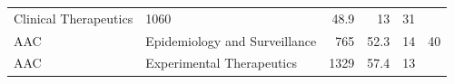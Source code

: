 \documentclass[11pt,]{article}
\begin{document}
\begin{longtable}[]{@{}llrrrr@{}}
\begin{minipage}[t]{0.43\columnwidth}
Clinical Therapeutics\strut
\end{minipage} & \begin{minipage}[t]{0.04\columnwidth}\raggedleft\strut
1060\strut
\end{minipage} & \begin{minipage}[t]{0.08\columnwidth}\raggedleft\strut
48.9\strut
\end{minipage} & \begin{minipage}[t]{0.11\columnwidth}\raggedleft\strut
13\strut
\end{minipage} & \begin{minipage}[t]{0.11\columnwidth}\raggedleft\strut
31\strut
\end{minipage}\tabularnewline
\begin{minipage}[t]{0.06\columnwidth}\raggedright\strut
AAC\strut
\end{minipage} & \begin{minipage}[t]{0.43\columnwidth}\raggedright\strut
Epidemiology and Surveillance\strut
\end{minipage} & \begin{minipage}[t]{0.04\columnwidth}\raggedleft\strut
765\strut
\end{minipage} & \begin{minipage}[t]{0.08\columnwidth}\raggedleft\strut
52.3\strut
\end{minipage} & \begin{minipage}[t]{0.11\columnwidth}\raggedleft\strut
14\strut
\end{minipage} & \begin{minipage}[t]{0.11\columnwidth}\raggedleft\strut
40\strut
\end{minipage}\tabularnewline
\begin{minipage}[t]{0.06\columnwidth}\raggedright\strut
AAC\strut
\end{minipage} & \begin{minipage}[t]{0.43\columnwidth}\raggedright\strut
Experimental Therapeutics\strut
\end{minipage} & \begin{minipage}[t]{0.04\columnwidth}\raggedleft\strut
1329\strut
\end{minipage} & \begin{minipage}[t]{0.08\columnwidth}\raggedleft\strut
57.4\strut
\end{minipage} & \begin{minipage}[t]{0.11\columnwidth}\raggedleft\strut
13\strut
\end{minipage} & \begin{minipage}[t]{0.11\columnwidth}\raggedleft\strut

\end{minipage}
\end{longtable}
\end{document}
